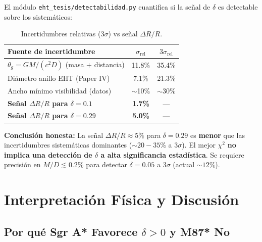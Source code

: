 \documentclass[12pt,a4paper]{article}
\begin{document}
El módulo \texttt{eht\_tesis/detectabilidad.py} cuantifica si la señal de $\delta$ es detectable sobre los sistemáticos:

\begin{table}[H]
\centering
\caption{Incertidumbres relativas ($3\sigma$) vs señal $\Delta R/R$.}
\label{tab:detectability}
\begin{tabular}{lcc}
\toprule
Fuente de incertidumbre & $\sigma_{\text{rel}}$ & $3\sigma_{\text{rel}}$ \\
\midrule
$\theta_g = GM/(c^2D)$ (masa + distancia) & 11.8\% & 35.4\% \\
Diámetro anillo EHT (Paper IV) & 7.1\% & 21.3\% \\
Ancho mínimo visibilidad (datos) & $\sim$10\% & $\sim$30\% \\
\midrule
\textbf{Señal $\Delta R/R$ para $\delta=0.1$} & \textbf{1.7\%} & --- \\
\textbf{Señal $\Delta R/R$ para $\delta=0.29$} & \textbf{5.0\%} & --- \\
\bottomrule
\end{tabular}
\end{table}

\textbf{Conclusión honesta:} La señal $\Delta R/R \approx 5\%$ para $\delta=0.29$ es \textbf{menor} que las incertidumbres sistemáticas dominantes ($\sim 20-35\%$ a $3\sigma$). El mejor $\chi^2$ \textbf{no implica una detección de $\delta$ a alta significancia estadística}. Se requiere precisión en $M/D \lesssim 0.2\%$ para detectar $\delta=0.05$ a $3\sigma$ (actual $\sim 12\%$).

\section{Interpretación Física y Discusión}

\subsection{Por qué Sgr A* Favorece $\delta > 0$ y M87* No}
\end{document}
